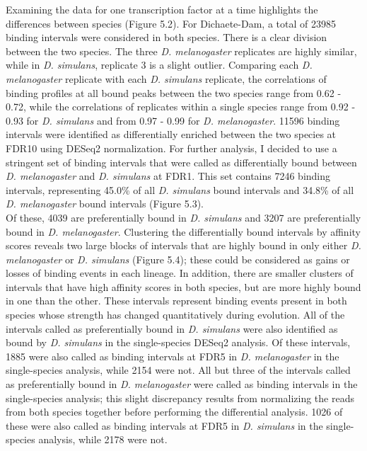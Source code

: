 Examining the data for one transcription factor at a time highlights the differences between species (Figure 5.2). For Dichaete-Dam, a total of 23985 binding intervals were considered in both species. There is a clear division between the two species. The three \emph{D. melanogaster} replicates are highly similar, while in \emph{D. simulans}, replicate 3 is a slight outlier. Comparing each \emph{D. melanogaster} replicate with each \emph{D. simulans} replicate, the correlations of binding profiles at all bound peaks between the two species range from 0.62 - 0.72, while the correlations of replicates within a single species range from 0.92 - 0.93 for \emph{D. simulans} and from 0.97 - 0.99 for \emph{D. melanogaster}. 11596 binding intervals were identified as differentially enriched between the two species at FDR10 using DESeq2 normalization. For further analysis, I decided to use a stringent set of binding intervals that were called as differentially bound between \emph{D. melanogaster} and \emph{D. simulans} at FDR1. This set contains 7246 binding intervals, representing 45.0\% of all \emph{D. simulans} bound intervals and 34.8\% of all \emph{D. melanogaster} bound intervals (Figure 5.3).\\

Of these, 4039 are preferentially bound in \emph{D. simulans} and 3207 are preferentially bound in \emph{D. melanogaster}. Clustering the differentially bound intervals by affinity scores reveals two large blocks of intervals that are highly bound in only either \emph{D. melanogaster} or \emph{D. simulans} (Figure 5.4); these could be considered as gains or losses of binding events in each lineage. In addition, there are smaller clusters of intervals that have high affinity scores in both species, but are more highly bound in one than the other. These intervals represent binding events present in both species whose strength has changed quantitatively during evolution. All of the intervals called as preferentially bound in \emph{D. simulans} were also identified as bound by \emph{D. simulans} in the single-species DESeq2 analysis. Of these intervals, 1885 were also called as binding intervals at FDR5 in \emph{D. melanogaster} in the single-species analysis, while 2154 were not. All but three of the intervals called as preferentially bound in \emph{D. melanogaster} were called as binding intervals in the single-species analysis; this slight discrepancy results from normalizing the reads from both species together before performing the differential analysis. 1026 of these were also called as binding intervals at FDR5 in \emph{D. simulans} in the single-species analysis, while 2178 were not.\\

